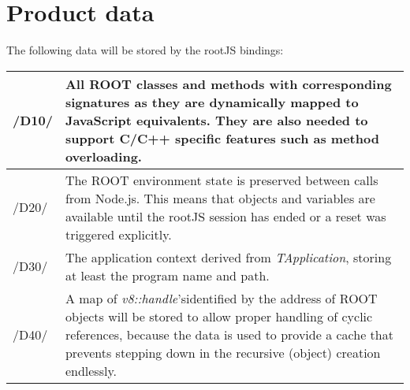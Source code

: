 \chapter{Product data}

The following data will be stored by the rootJS bindings: \\

\begin{longtable}{|p{1cm} | p{15cm}|}
\hline
/D10/ & All ROOT classes and methods with corresponding signatures as they are dynamically mapped to JavaScript equivalents. They are also needed to support C/C++ specific features such as method overloading.\\
\hline
/D20/ & The ROOT environment state is preserved between calls from Node.js. This means that objects and variables are available until the rootJS session has ended or a reset was triggered explicitly.\\
\hline
/D30/ & The application context derived from \textit{TApplication}\footnotemark[1], storing at least the program name and path.\\
\hline
/D40/ & A map of \textit{v8::handle}'s\footnotemark[1] identified by the address of ROOT objects will be stored to allow proper handling of cyclic references, because the data is used to provide a cache that prevents stepping down in the recursive (object) creation endlessly.\\
\hline
\end{longtable}
